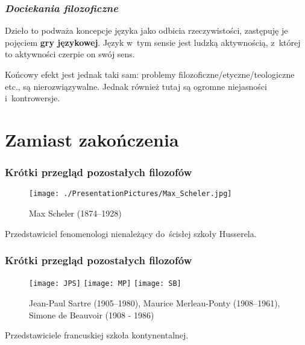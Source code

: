 \documentclass[10pt,t]{beamer}
\begin{document}
\begin{frame}
  \frametitle{\textit{Dociekania filozoficzne}}


  Dzieło to podważa koncepcje języka jako odbicia rzeczywistości,
  zastępuję je pojęciem \textbf{gry językowej}. Język w~tym sensie jest
  ludzką aktywnością, z~której to aktywności czerpie on swój sens.

  Końcowy efekt jest jednak taki sam: problemy
  filozoficzne/etyczne/teologiczne etc., są nierozwiązywalne. Jednak
  również tutaj są ogromne niejasności i~kontrowersje.

\end{frame}










\section{Zamiast zakończenia}



\begin{frame}
  \frametitle{Krótki przegląd pozostałych filozofów}


  \begin{figure}

    \centering

    \texttt{[image: ./PresentationPictures/Max\_Scheler.jpg]}


    \caption{Max Scheler (1874--1928)}

  \end{figure}


  Przedstawiciel fenomenologi nienależący do~ścisłej szkoły Husserela.

\end{frame}





\begin{frame}
  \frametitle{Krótki przegląd pozostałych filozofów}


  \begin{figure}

    \centering

    \texttt{[image: JPS]}
    \texttt{[image: MP]}
    \texttt{[image: SB]}


    \caption{Jean-Paul Sartre (1905--1980), Maurice
      Merleau-Ponty (1908--1961), Simone de Beauvoir
      (1908 - 1986)}

    \end{figure}



  Przedstawiciele francuskiej szkoła kontynentalnej.

\end{frame}
\end{document}
